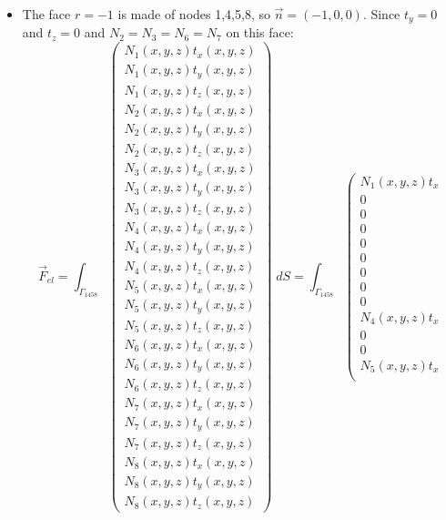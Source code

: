 \begin{itemize}
\item The face $r=-1$ is made of nodes 1,4,5,8, so $\vec{n}=(-1,0,0)$.
Since $t_y=0$ and $t_z=0$ and $N_2=N_3=N_6=N_7$ on this face:
{\tiny
\[
\vec{F}_{el}=
\int_{\Gamma_{1458}} 
\left(
\begin{array}{c}
N_1(x,y,z) t_x(x,y,z)\\
N_1(x,y,z) t_y(x,y,z)\\
N_1(x,y,z) t_z(x,y,z)\\
N_2(x,y,z) t_x(x,y,z)\\
N_2(x,y,z) t_y(x,y,z)\\
N_2(x,y,z) t_z(x,y,z)\\
N_3(x,y,z) t_x(x,y,z)\\
N_3(x,y,z) t_y(x,y,z)\\
N_3(x,y,z) t_z(x,y,z)\\
N_4(x,y,z) t_x(x,y,z)\\
N_4(x,y,z) t_y(x,y,z)\\
N_4(x,y,z) t_z(x,y,z)\\
N_5(x,y,z) t_x(x,y,z)\\
N_5(x,y,z) t_y(x,y,z)\\
N_5(x,y,z) t_z(x,y,z)\\
N_6(x,y,z) t_x(x,y,z)\\
N_6(x,y,z) t_y(x,y,z)\\
N_6(x,y,z) t_z(x,y,z)\\
N_7(x,y,z) t_x(x,y,z)\\
N_7(x,y,z) t_y(x,y,z)\\
N_7(x,y,z) t_z(x,y,z)\\
N_8(x,y,z) t_x(x,y,z)\\
N_8(x,y,z) t_y(x,y,z)\\
N_8(x,y,z) t_z(x,y,z)
\end{array}
\right)
\; dS
=
\int_{\Gamma_{1458}} 
\left(
\begin{array}{c}
N_1(x,y,z) t_x\\
0 \\
0 \\
0\\
0\\
0\\
0\\
0\\
0\\
N_4(x,y,z) t_x\\
0\\
0\\
N_5(x,y,z) t_x\\

\end{array}\]}
\end{itemize}
